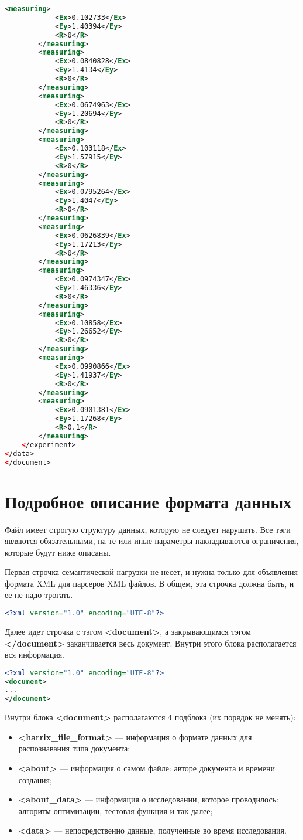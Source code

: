 \documentclass[a4paper,12pt]{article}
\begin{document}
\begin{lstlisting}[label=Example01, language=xml ,caption=Пример части файла Harrix Optimization Testing]
		<measuring>
			<Ex>0.102733</Ex>
			<Ey>1.40394</Ey>
			<R>0</R>
		</measuring>
		<measuring>
			<Ex>0.0840828</Ex>
			<Ey>1.4134</Ey>
			<R>0</R>
		</measuring>
		<measuring>
			<Ex>0.0674963</Ex>
			<Ey>1.20694</Ey>
			<R>0</R>
		</measuring>
		<measuring>
			<Ex>0.103118</Ex>
			<Ey>1.57915</Ey>
			<R>0</R>
		</measuring>
		<measuring>
			<Ex>0.0795264</Ex>
			<Ey>1.4047</Ey>
			<R>0</R>
		</measuring>
		<measuring>
			<Ex>0.0626839</Ex>
			<Ey>1.17213</Ey>
			<R>0</R>
		</measuring>
		<measuring>
			<Ex>0.0974347</Ex>
			<Ey>1.46336</Ey>
			<R>0</R>
		</measuring>
		<measuring>
			<Ex>0.10858</Ex>
			<Ey>1.26652</Ey>
			<R>0</R>
		</measuring>
		<measuring>
			<Ex>0.0990866</Ex>
			<Ey>1.41937</Ey>
			<R>0</R>
		</measuring>
		<measuring>
			<Ex>0.0901381</Ex>
			<Ey>1.17268</Ey>
			<R>0.1</R>
		</measuring>
	</experiment>
</data>
</document>
\end{lstlisting}

\section{Подробное описание формата данных}

Файл имеет строгую структуру данных, которую не следует нарушать. Все тэги являются обязательными, на те или иные параметры накладываются ограничения, которые будут ниже описаны.

Первая строчка семантической нагрузки не несет, и нужна только для объявления формата XML для парсеров XML файлов. В общем, эта строчка должна быть, и ее не надо трогать.

\begin{lstlisting}[label=Part01, language=xml ,caption=Первая строчка файла Harrix Optimization Testing]
<?xml version="1.0" encoding="UTF-8"?>
\end{lstlisting}

Далее идет строчка с тэгом \textbf{<document>}, а закрывающимся тэгом \textbf{</document>} заканчивается весь документ. Внутри этого блока располагается вся информация.

\begin{lstlisting}[label=Part02, language=xml ,caption=Блок <document> в файле Harrix Optimization Testing]
<?xml version="1.0" encoding="UTF-8"?>
<document>
...
</document>
\end{lstlisting}

Внутри блока \textbf{<document>} располагаются $ 4 $ подблока (их порядок не менять):
\begin{itemize}
\item \textbf{<harrix\_file\_format>} --- информация о формате данных для распознавания типа документа;
\item \textbf{<about>} --- информация о самом файле:  авторе документа и времени создания;
\item \textbf{<about\_data>} --- информация о исследовании, которое проводилось: алгоритм оптимизации, тестовая функция и так далее;
\item \textbf{<data>} --- непосредственно данные, полученные во время исследования.
\end{itemize}
\end{document}
